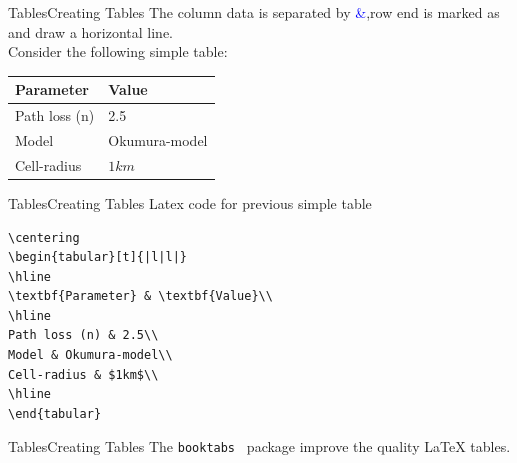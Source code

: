 \documentclass{bredelebeamer}
\begin{document}
\begin{frame}[fragile]{Tables}{Creating Tables}
The column data is separated by \textcolor{blue}{\&},row end is marked as \texttt{\\} and \texttt{\hline} draw a horizontal line.\\[0.5cm]
Consider the following simple table:\\

\centering
\begin{tabular}[c]{|l|l|}
\hline 
\textbf{Parameter} & \textbf{Value}\\
\hline 
Path loss (n) & 2.5\\
Model & Okumura-model\\
Cell-radius & $1km$\\
\hline
\end{tabular}

\end{frame}

\begin{frame}[fragile]{Tables}{Creating Tables}
Latex code for previous simple table\\
\begin{verbatim}
\centering
\begin{tabular}[t]{|l|l|}
\hline 
\textbf{Parameter} & \textbf{Value}\\
\hline 
Path loss (n) & 2.5\\
Model & Okumura-model\\
Cell-radius & $1km$\\
\hline
\end{tabular}
\end{verbatim}

\end{frame}



\begin{frame}[fragile]{Tables}{Creating Tables}
The \alert{\texttt{booktabs }} package  improve the quality  LaTeX tables.
\end{frame}
\end{document}
